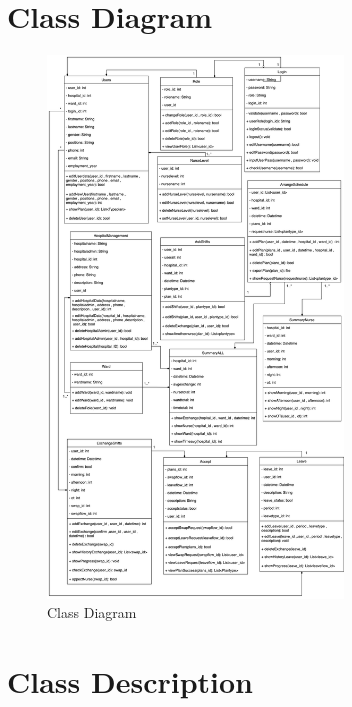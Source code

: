 \section{Class Diagram}
\begin{figure}[h]
    \centering
    \includegraphics[width=0.7\textwidth]{Class Diagram.png}
    \caption{Class Diagram}
    \end{figure}
\clearpage



\section{Class Description}





